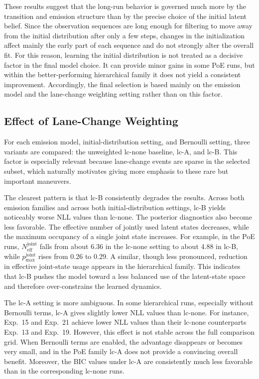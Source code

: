 \par These results suggest that the long-run behavior is governed much more by the transition and emission structure than by the precise 
choice of the initial latent belief. 
Since the observation sequences are long enough for filtering to move away from the initial distribution after only a few steps, changes in the initialization affect mainly 
the early part of each sequence and do not strongly alter the overall fit. 
For this reason, learning the initial distribution is not treated as a decisive factor in the final model choice. 
It can provide minor gains in some \ac{PoE} runs, but within the better-performing hierarchical family it does not yield a consistent improvement. 
Accordingly, the final selection is based mainly on the emission model and the lane-change weighting setting rather than on this factor.

\subsection{Effect of Lane-Change Weighting}
For each emission model, initial-distribution setting, and Bernoulli setting, three variants are compared: the unweighted lc-none baseline, lc-A, and lc-B.  
This factor is especially relevant because lane-change events are sparse in the selected subset, which naturally motivates giving more emphasis to these rare but important maneuvers.

\par The clearest pattern is that lc-B consistently degrades the results. 
Across both emission families and across both initial-distribution settings, lc-B yields noticeably worse \ac{NLL} values than lc-none. 
The posterior diagnostics also become less favorable. The effective number of jointly used latent states decreases, while the maximum occupancy of a single joint state increases. 
For example, in the \ac{PoE} runs, $N_{\mathrm{eff}}^{\mathrm{joint}}$ falls from about 6.36 in the lc-none setting to about 4.88 in lc-B, 
while $p_{\max}^{\mathrm{joint}}$ rises from 0.26 to 0.29. 
A similar, though less pronounced, reduction in effective joint-state usage appears in the hierarchical family. 
This indicates that lc-B pushes the model toward a less balanced use of the latent-state space and therefore over-constrains the learned dynamics.

\par The lc-A setting is more ambiguous. 
In some hierarchical runs, especially without Bernoulli terms, lc-A gives slightly lower \ac{NLL} values than lc-none. 
For instance, Exp.~15 and Exp.~21 achieve lower \ac{NLL} values than their lc-none counterparts Exp.~13 and Exp.~19. 
However, this effect is not stable across the full comparison grid. 
When Bernoulli terms are enabled, the advantage disappears or becomes very small, and in the \ac{PoE} family lc-A does not provide a convincing overall benefit.  
Moreover, the \ac{BIC} values under lc-A are consistently much less favorable than in the corresponding lc-none runs.


